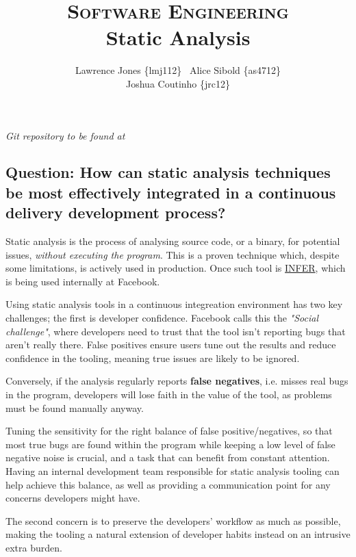 \documentclass[11pt]{article}
\title{\textsc{Software Engineering}\\Static Analysis}
\author{Lawrence Jones \{lmj112\} \  Alice Sibold \{as4712\} \\
        Joshua Coutinho \{jrc12\}}
\date{}
\begin{document}
\maketitle


\textit{Git repository to be found at
}

\subsection*{Question: How can static analysis techniques be most effectively
integrated in a continuous delivery development process?}

Static analysis is the process of analysing source code, or a binary, for
potential issues, \textit{without executing the program}. This is a proven
technique which, despite some limitations\cite{sethi15}\cite{anderson08}, is
actively used in production. Once such tool is
\href{http://fbinfer.com/}{INFER}, which is being used internally at Facebook.

Using static analysis tools in a continuous integreation environment has two
key challenges\cite{calcagno15}; the first is developer confidence. Facebook
calls this the \textit{"Social challenge"}, where developers need to trust that
the tool isn't reporting bugs that aren't really there. False positives ensure
users tune out the results and reduce confidence in the tooling, meaning true
issues are likely to be ignored.

Conversely, if the analysis regularly reports \textbf{false negatives}, i.e.
misses real bugs in the program, developers will lose faith in the value of the
tool, as problems must be found manually anyway.

Tuning the sensitivity for the right balance of false positive/negatives, so
that most true bugs are found within the program while keeping a low level of
false negative noise is crucial, and a task that can benefit from constant
attention. Having an internal development team responsible for static analysis
tooling can help achieve this balance\cite{calcagno15}, as well as providing a
communication point for any concerns developers might have.

The second concern is to preserve the developers' workflow as much as possible,
making the tooling a natural extension of developer habits instead on an
intrusive extra burden.
\end{document}
